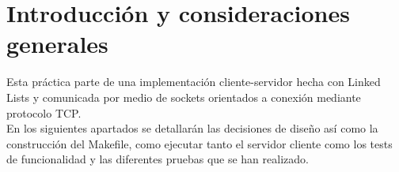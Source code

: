 \section{Introducción y consideraciones generales}

Esta práctica parte de una implementación cliente-servidor hecha con Linked Lists y comunicada por medio de sockets orientados a conexión mediante protocolo TCP.\\

En los siguientes apartados se detallarán las decisiones de diseño así como la construcción del Makefile, como ejecutar tanto el servidor cliente como los tests de funcionalidad y las diferentes pruebas que se han realizado.